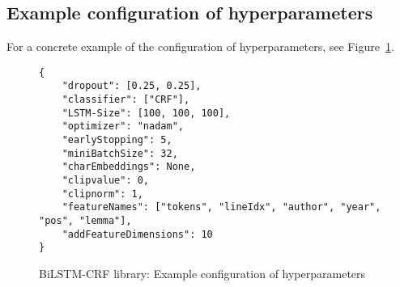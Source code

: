 \subsection{Example configuration of hyperparameters}
For a concrete example of the configuration of hyperparameters, see Figure~\ref{fig:bilstm-crf-hyperparameters-config}.

\begin{figure}[htpb]
\centering
\begin{verbatim}
{
    "dropout": [0.25, 0.25],
    "classifier": ["CRF"],
    "LSTM-Size": [100, 100, 100],
    "optimizer": "nadam",
    "earlyStopping": 5,
    "miniBatchSize": 32,
    "charEmbeddings": None,
    "clipvalue": 0,
    "clipnorm": 1,
    "featureNames": ["tokens", "lineIdx", "author", "year", "pos", "lemma"],
    "addFeatureDimensions": 10
}
\end{verbatim}
\caption{BiLSTM-CRF library: Example configuration of hyperparameters}\label{fig:bilstm-crf-hyperparameters-config}
\end{figure}